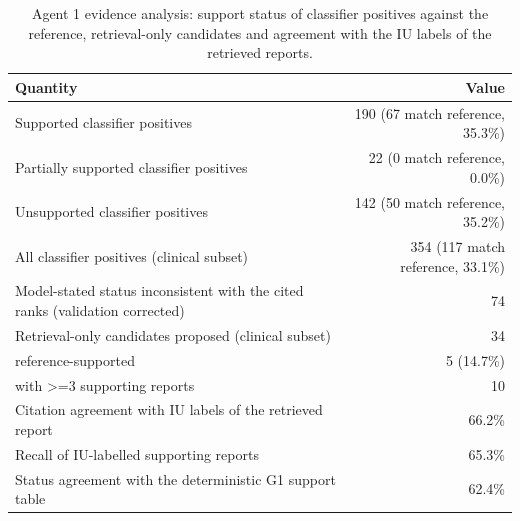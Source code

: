 \begin{table}[t]
\centering
\scriptsize
\begin{tabular}{lr}
\hline
Quantity & Value \\
\hline
Supported classifier positives & 190 (67 match reference, 35.3\%) \\
Partially supported classifier positives & 22 (0 match reference, 0.0\%) \\
Unsupported classifier positives & 142 (50 match reference, 35.2\%) \\
All classifier positives (clinical subset) & 354 (117 match reference, 33.1\%) \\
Model-stated status inconsistent with the cited ranks (validation corrected) & 74 \\
Retrieval-only candidates proposed (clinical subset) & 34 \\
  reference-supported & 5 (14.7\%) \\
  with >=3 supporting reports & 10 \\
Citation agreement with IU labels of the retrieved report & 66.2\% \\
Recall of IU-labelled supporting reports & 65.3\% \\
Status agreement with the deterministic G1 support table & 62.4\% \\
\hline
\end{tabular}
\caption{Agent 1 evidence analysis: support status of classifier positives against the reference, retrieval-only candidates and agreement with the IU labels of the retrieved reports.}
\label{tab:table4_agent1_evidence_analysis}
\end{table}
